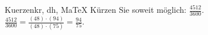 \begin{MAufgabe}{Kuerzen}{kr, dh, MaTeX}
K\"urzen Sie soweit m\"oglich: $\frac{4512}{3600}$.\\ 
\ifLsg\MLoesung
\quad $\frac{4512}{3600}=\frac{(48)\cdot(94)}{(48)\cdot(75)}=\frac{94}{75}$.\else\relax\fi
 \end{MAufgabe}